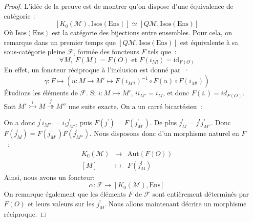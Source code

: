 \documentclass{amsart}
\theoremstyle{plain}
\theoremstyle{definition}
\theoremstyle{remark}
\newcommand{\M}{\mathcal{M}}
\newcommand{\Isos}[1]{\mathrm{Isos}(#1)}
\newcommand{\Aut}[1]{\mathrm{Aut}({#1})}
\newcommand{\id}{\mathrm{id}}
\newcommand{\Ens}{\mathrm{Ens}}
\newcommand{\xrightarrowtail}[1]{\overset{#1}{\rightarrowtail}}
\newcommand{\xtwoheadrightarrow}[1]{\overset{#1}{\twoheadrightarrow}}
\newcommand{\ra}{\rightarrow}
\newcommand{\exacname}[5]{{#1}\xrightarrowtail{#2} {#3}\xtwoheadrightarrow{#4} {#5}}
\begin{document}
\begin{proof}
  L'idée de la preuve est de montrer qu'on dispose d'une équivalence de catégorie~:
  $$[K_0(\M),\Isos{\Ens}]\simeq [Q\M,\Isos{\Ens}]$$
  Où $\Isos{\Ens}$ est la catégorie des bijections entre ensembles.
  Pour cela, on remarque dans un premier temps que $[Q\M,\Isos{\Ens}]$ est équivalente à sa sous-catégorie pleine $\mathcal{F}$,
  formée des foncteurs $F$ tels que~:
  $$\forall M,\; F(M)=F(O)\text{ et }F(i_{M!})=\id_{F(O)}$$
  En effet, un foncteur réciproque à l'inclusion est donné par~·
  $$\gamma:F\mapsto (u:M\ra M'\mapsto F(i_{M'!})^{-1}\circ F(u)\circ F(i_{M!}))$$
  Étudions les éléments de $\mathcal{F}$. Si $i:M\rightarrowtail M'$, $ii_{M'}=i_M$, et donc $F(i_!)=id_{F(O)}$. 
  Soit $\exacname{M'}{i}{M}{j}{M''}$ une suite exacte. On a un carré bicartésien~:
  \begin{center}
  \end{center}
  On a donc $j^!i_{M''!}=i_!j_{M'}^!$, puis $F(j^!)=F(j_{M'}^!)$. De plus $j_M^!=j^!j_{M''}^!$. Donc $F(j_M^!)=F(j_{M'}^!)F(j_{M''}^!)$.
  Nous disposons donc d'un morphisme naturel en $F$~:
  $$
    \begin{array}{lcl}
      K_0(\M) &\ra     & \Aut{F(O)} \\
      {[{M}]} &\mapsto & F(j_M^!)
    \end{array}
  $$
  Ainsi, nous avons un foncteur:
  $$ \alpha : \mathcal{F}\ra [K_0(\M),\Ens]$$
  On remarque également que les éléments $F$ de $\mathcal{F}$ sont entièrement déterminés par $F(O)$ et leurs valeurs sur les $j_M^!$.
  Nous allons maintenant décrire un morphisme réciproque. 
  

\end{proof}
\end{document}

